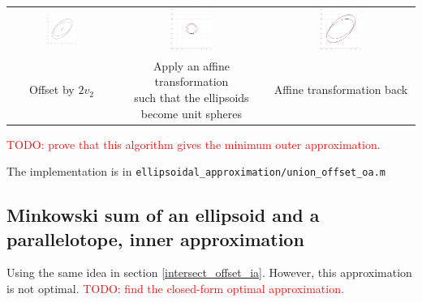 \documentclass{article}
\begin{document}
\begin{table}[H]
\begin{tabular}{ccc}
		\includegraphics[width=0.3\textwidth]{union_offset_oa/6.pdf} & \includegraphics[width=0.3\textwidth]{union_offset_oa/7.pdf} & \includegraphics[width=0.3\textwidth]{union_offset_oa/8.pdf}\\
		Offset by $2v_2$ & \makecell{Apply an affine transformation \\such that the ellipsoids \\become unit spheres} & Affine transformation back
	\end{tabular}
	\label{union_offset_oa2}
\end{table}

\textcolor{red}{TODO: prove that this algorithm gives the minimum outer approximation. }

The implementation is in \texttt{ellipsoidal\_approximation/union\_offset\_oa.m}


\subsection{Minkowski sum of an ellipsoid and a parallelotope, inner approximation}
Using the same idea in section \ref{intersect_offset_ia}. However, this approximation is not optimal. \textcolor{red}{TODO: find the closed-form optimal approximation.}
\end{document}
